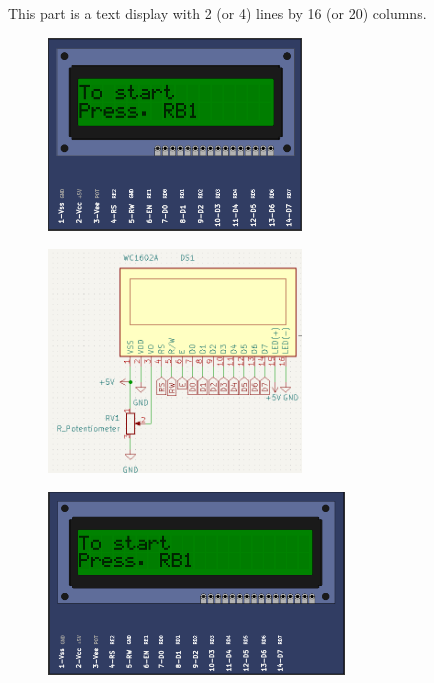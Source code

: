 This part is a text display with 2 (or 4) lines by 16 (or 20) columns.

\begin{figure}[H]
\center
\includegraphics[width=0.6\textwidth]{img/part_hd44780_2x16.png} 
\end{figure} 

\begin{figure}[H]
\center
\includegraphics[width=0.6\textwidth]{img/part_hd44780_2x16_.png} 
\end{figure} 


\begin{figure}[H]
\center
\includegraphics[width=0.7\textwidth]{img/part_hd44780_2x20.png} 
\end{figure} 

